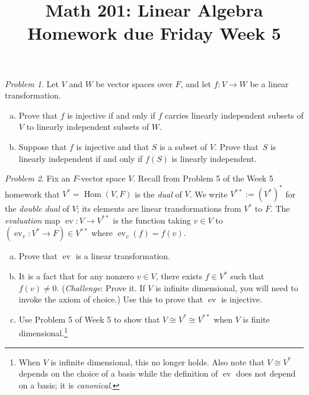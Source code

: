 \documentclass[11pt,twoside]{amsart}
\title{Math 201: Linear Algebra\\ Homework due Friday Week 5}
\theoremstyle{plain}
\theoremstyle{remark}
\newtheorem{prob}{Problem}
\theoremstyle{definition}
\theoremstyle{definition}
\newcommand{\Hom}{\operatorname{Hom}}
\newcommand{\ev}{\operatorname{ev}}
\begin{document}
\maketitle

\begin{prob}
Let $V$ and $W$ be vector spaces over $F$, and let $f\colon V \to W$ be a linear transformation.
    \begin{enumerate}[(a)]
     \item Prove that $f$ is injective if and only if $f$ carries linearly independent subsets of $V$ to linearly independent subsets of $W$.
     \item Suppose that $f$ is injective and that $S$ is a subset of $V$. Prove
       that~$S$ is linearly independent if and only if $f(S)$ is linearly
       independent. 
    \end{enumerate}
\end{prob}


\begin{prob}
Fix an $F$-vector space $V$. Recall from Problem 5 of the Week 5 homework that $V^* = \Hom(V,F)$ is the \emph{dual} of $V$. We write $V^{**} := (V^*)^*$ for the \emph{double dual} of $V$; its elements are linear transformations from $V^*$ to $F$.  The \emph{evaluation} map $\ev\colon V\to V^{**}$ is the function taking $v\in V$ to $(\ev_v\colon V^*\to F)\in V^{**}$ where $\ev_v(f) = f(v)$.
\begin{enumerate}[(a)]
\item Prove that $\ev$ is a linear transformation.
\item It is a fact that for any nonzero $v\in V$, there exists $f\in V^*$ such that $f(v)\ne 0$. (\emph{Challenge}: Prove it. If $V$ is infinite dimensional, you will need to invoke the axiom of choice.) Use this to prove that $\ev$ is injective.
\item Use Problem 5 of Week 5 to show that $V\cong V^*\cong V^{**}$ when $V$ is finite dimensional.\footnote{When $V$ is infinite dimensional, this no longer holds.  Also note that $V\cong V^*$ depends on the choice of a basis while the definition of $\ev$ does not depend on a basis; it is \emph{canonical}.}
\end{enumerate}
\end{prob}
\end{document}

